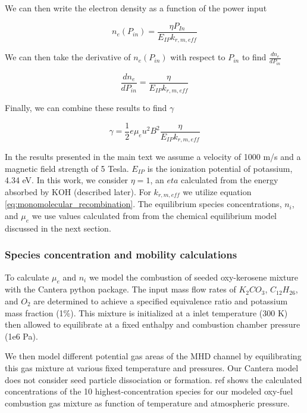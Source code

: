 We can then write the electron density as a function of the power input

\begin{equation}
n_{e}(P_{in}) = \frac{\eta P_{In}}{E_{IP}k_{r, m, eff}}
\end{equation}

We can then take the derivative of $n_{e}(P_{in})$ with respect to $P_{in}$ to find $\frac{dn_{e}}{dP_{in}}$

\begin{equation}
\frac{dn_{e}}{dP_{in}} = \frac{\eta}{E_{IP}k_{r, m, eff}}
\end{equation}

Finally, we can combine these results to find $\gamma$

\begin{equation}
\gamma = \frac{1}{2} e \mu_e u^2 B^2 \frac{\eta}{E_{IP}k_{r, m, eff}}
\end{equation}

In the results presented in the main text we assume a velocity of 1000 m/s and a magnetic field strength of 5 Tesla. $E_{IP}$ is the ionization potential of potassium, 4.34 eV. In this work, we consider $\eta =1$, an $eta$ calculated from the energy absorbed by KOH (described later). For $k_{r, m, eff}$ we utilize equation \ref{eq:monomolecular_recombination}. The equilibrium species concentrations, $n_i$, and $\mu_e$ we use values calculated from from the chemical equilibrium model discussed in the next section. 




\subsubsection{Species concentration and mobility calculations}

To calculate $\mu_e$ and $n_i$ we model the combustion of seeded oxy-kerosene mixture with the Cantera python package. The input mass flow rates of $K_2CO_3$, $C_{12}H_{26}$, and $O_2$ are determined to achieve a specified equivalence ratio and potassium mass fraction (1\%). This mixture is initialized at a inlet temperature (300 K) then allowed to equilibrate at a fixed enthalpy and combustion chamber pressure (1e6 Pa).

We then model different potential gas areas of the MHD channel by equilibrating this gas mixture at various fixed temperature and pressures. Our Cantera model does not consider seed particle dissociation or formation. ref shows the calculated concentrations of the 10 highest-concentration species for our modeled oxy-fuel combustion gas mixture as function of temperature and atmospheric pressure.

